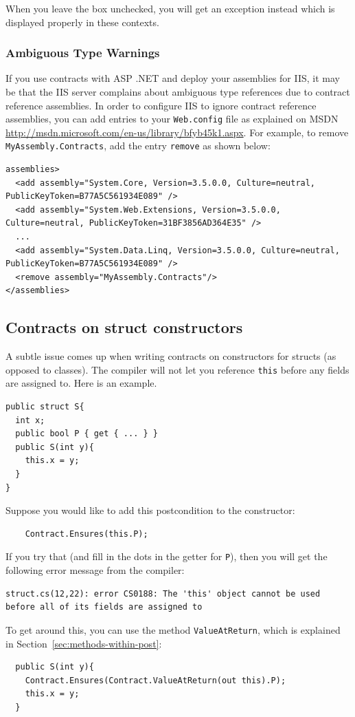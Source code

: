 \documentclass{article}
\newcommand{\code}[1]{\lstinline{#1}}
\begin{document}
When you leave the box unchecked, you will get an exception instead
which is displayed properly in these contexts.

\subsubsection{Ambiguous Type Warnings}
If you use contracts with ASP .NET and deploy your assemblies for IIS,
it may be that the IIS server complains about ambiguous type
references due to contract reference assemblies. In order to configure
IIS to ignore contract reference assemblies, you can add entries to
your \code{Web.config} file as explained on MSDN
\url{http://msdn.microsoft.com/en-us/library/bfyb45k1.aspx}. For
example, to remove \code{MyAssembly.Contracts}, add the entry
\code{remove} as shown below:
\begin{lstlisting}
assemblies>
  <add assembly="System.Core, Version=3.5.0.0, Culture=neutral, PublicKeyToken=B77A5C561934E089" />
  <add assembly="System.Web.Extensions, Version=3.5.0.0, Culture=neutral, PublicKeyToken=31BF3856AD364E35" />
  ...
  <add assembly="System.Data.Linq, Version=3.5.0.0, Culture=neutral, PublicKeyToken=B77A5C561934E089" />
  <remove assembly="MyAssembly.Contracts"/>
</assemblies>
\end{lstlisting}


\subsection{Contracts on struct constructors}
A subtle issue comes up when writing contracts on constructors for structs (as opposed to classes).
The compiler will not let you reference \code{this} before any fields are assigned to.
Here is an example.
\begin{lstlisting}
public struct S{
  int x;
  public bool P { get { ... } }
  public S(int y){
    this.x = y;
  }
}
\end{lstlisting}
Suppose you would like to add this postcondition to the constructor:
\begin{lstlisting}
    Contract.Ensures(this.P);
\end{lstlisting}
If you try that (and fill in the dots in the getter for \code{P}), then you will get the following error message from the compiler:
\begin{lstlisting}
struct.cs(12,22): error CS0188: The 'this' object cannot be used before all of its fields are assigned to
\end{lstlisting}
To get around this, you can use the method \code{ValueAtReturn}, which is explained in Section~\ref{sec:methods-within-post}:
\begin{lstlisting}
  public S(int y){
    Contract.Ensures(Contract.ValueAtReturn(out this).P);
    this.x = y;
  }
\end{lstlisting}
\end{document}
